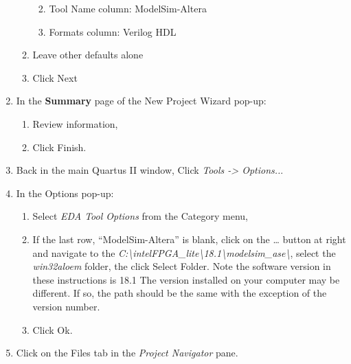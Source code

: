 \begin{enumerate}
\begin{enumerate}
                \begin{enumerate}
                        \def\labelenumiii{\roman{enumiii}.}
                    \item
                        Tool Name column: ModelSim-Altera
                    \item
                        Formats column: Verilog HDL
                \end{enumerate}
            \item
                Leave other defaults alone
            \item
                Click Next
        \end{enumerate}
    \item
        In the \textbf{Summary} page of the New Project Wizard pop-up:

        \begin{enumerate}
                \def\labelenumii{\alph{enumii}.}
            \item
                Review information,
            \item
                Click Finish.
        \end{enumerate}
    \item
        Back in the main Quartus II window, Click \emph{Tools -\textgreater{}
        Options..}.
    \item
        In the Options pop-up:

        \begin{enumerate}
                \def\labelenumii{\alph{enumii}.}
            \item
                Select \emph{EDA Tool Options} from the Category menu,
            \item
                If the last row, ``ModelSim-Altera'' is blank, click on the \ldots{}
                button at right and navigate to the
                \emph{C:\textbackslash intelFPGA\_lite\textbackslash18.1\textbackslash modelsim\_ase\textbackslash{}},
                select the \emph{win32aloem} folder, the click Select Folder.  Note the software version in
                these instructions
                is 18.1  The version installed on your computer may be different.  If so, the path should be
                the same with the
                exception of the version number.
            \item
                Click Ok.
        \end{enumerate}
    \item
        Click on the Files tab in the \emph{Project Navigator} pane.


\end{enumerate}
